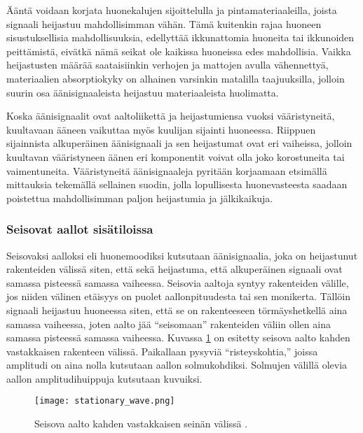 \documentclass[finnish,12pt]{article}
\begin{document}
Ääntä voidaan korjata huonekalujen sijoittelulla ja pintamateriaaleilla, joista signaali heijastuu mahdollisimman vähän. Tämä kuitenkin rajaa huoneen sisustuksellisia mahdollisuuksia, edellyttää ikkunattomia huoneita tai ikkunoiden peittämistä, eivätkä nämä seikat ole kaikissa huoneissa edes mahdollisia. Vaikka heijastusten määrää saataisiinkin verhojen ja mattojen avulla vähennettyä, materiaalien absorptiokyky on alhainen varsinkin matalilla taajuuksilla, jolloin suurin osa äänisignaaleista heijastuu materiaaleista huolimatta.  \cite{MMiyoshi1988}

Koska äänisignaalit ovat aaltoliikettä ja heijastumiensa vuoksi vääristyneitä, kuultavaan ääneen vaikuttaa myös kuulijan sijainti huoneessa. Riippuen sijainnista alkuperäinen äänisignaali ja sen heijastumat ovat eri vaiheissa, jolloin kuultavan vääristyneen äänen eri komponentit voivat olla joko korostuneita tai vaimentuneita. Vääristyneitä äänisignaaleja pyritään korjaamaan etsimällä mittauksia tekemällä sellainen suodin, jolla lopullisesta huonevasteesta saadaan poistettua mahdollisimman paljon heijastumia ja jälkikaikuja.

\subsubsection{Seisovat aallot sisätiloissa}

Seisovaksi aalloksi eli huonemoodiksi kutsutaan äänisignaalia, joka on heijastunut rakenteiden välissä siten, että sekä heijastuma, että alkuperäinen signaali ovat samassa pisteessä samassa vaiheessa. Seisovia aaltoja syntyy rakenteiden välille, jos niiden välinen etäisyys on puolet aallonpituudesta tai sen monikerta. Tällöin signaali heijastuu huoneessa siten, että se on rakenteeseen törmäyshetkellä aina samassa vaiheessa, joten aalto jää ``seisomaan'' rakenteiden väliin ollen aina samassa pisteessä samassa vaiheessa. Kuvassa \ref{fig:standing_wave} on esitetty seisova aalto kahden vastakkaisen rakenteen välissä. Paikallaan pysyviä ``risteyskohtia,'' joissa amplitudi on aina nolla kutsutaan aallon solmukohdiksi. Solmujen välillä olevia aallon amplitudihuippuja kutsutaan kuvuiksi.

\begin{figure}[h!]
	\centering
	\texttt{[image: stationary\_wave.png]}
	\caption{Seisova aalto kahden vastakkaisen seinän välissä \cite{YHaneda1994}.}
	\label{fig:standing_wave}
\end{figure} 
\end{document}
